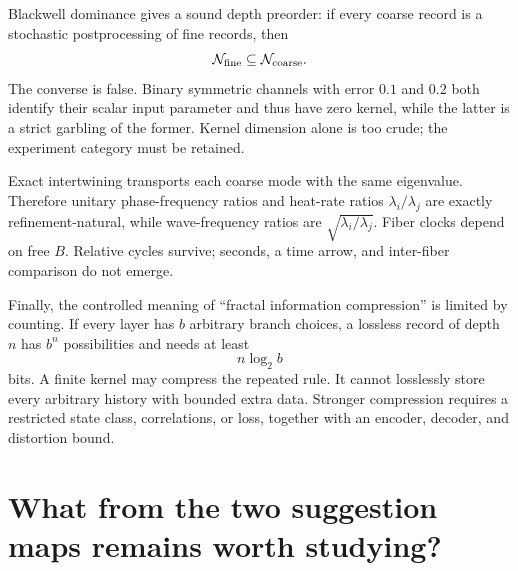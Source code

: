 \documentclass[11pt,a4paper]{article}
\begin{document}
Blackwell dominance gives a sound depth preorder: if every coarse record is a stochastic
postprocessing of fine records, then
\[
\mathcal N_{\rm fine}\subseteq\mathcal N_{\rm coarse}.
\]
The converse is false. Binary symmetric channels with error $0.1$ and $0.2$ both identify
their scalar input parameter and thus have zero kernel, while the latter is a strict
garbling of the former. Kernel dimension alone is too crude; the experiment category must
be retained.

Exact intertwining transports each coarse mode with the same eigenvalue. Therefore
unitary phase-frequency ratios and heat-rate ratios $\lambda_i/\lambda_j$ are exactly
refinement-natural, while wave-frequency ratios are
$\sqrt{\lambda_i/\lambda_j}$. Fiber clocks depend on free $B$. Relative cycles survive;
seconds, a time arrow, and inter-fiber comparison do not emerge.

Finally, the controlled meaning of ``fractal information compression'' is limited by
counting. If every layer has $b$ arbitrary branch choices, a lossless record of depth $n$
has $b^n$ possibilities and needs at least
\[
n\log_2 b
\]
bits. A finite kernel may compress the repeated rule. It cannot losslessly store every
arbitrary history with bounded extra data. Stronger compression requires a restricted
state class, correlations, or loss, together with an encoder, decoder, and distortion
bound.

\section{What from the two suggestion maps remains worth studying?}
\end{document}
